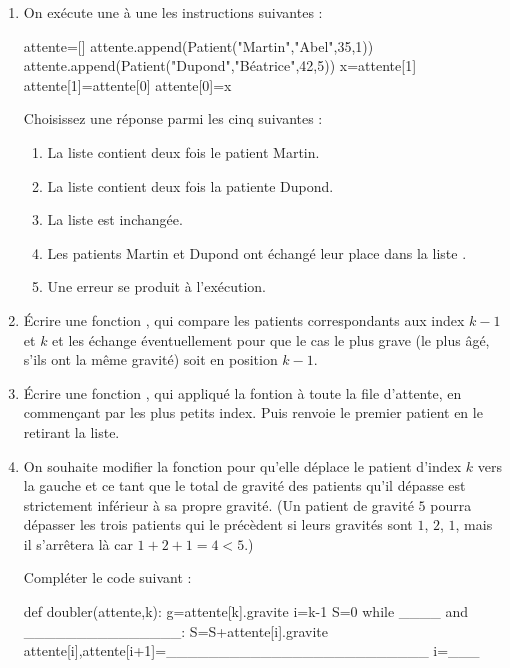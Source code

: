 \documentclass[11pt,a4paper,french,twoside]{VcCours}
\begin{document}
\begin{enumerate}
\begin{enumerate}
    \end{enumerate}
    \item On exécute une à une les instructions suivantes :
\begin{Python}
attente=[]
attente.append(Patient("Martin","Abel",35,1))
attente.append(Patient("Dupond","Béatrice",42,5))
x=attente[1]
attente[1]=attente[0]
attente[0]=x
\end{Python}
    Choisissez une réponse parmi les cinq suivantes :
    \begin{enumerate}
        \item La liste  contient deux fois le patient Martin. 
        \item La liste  contient deux fois la patiente Dupond. 
        \item La liste  est inchangée. 
        \item Les patients Martin et Dupond ont échangé leur place dans la liste . 
        \item Une erreur se produit à l'exécution. 
    \end{enumerate}
    \item Écrire une fonction , qui compare les patients
    correspondants aux index $k-1$ et $k$ et les échange éventuellement pour que
    le cas le plus grave (le plus âgé, s'ils ont la même gravité) soit en position $k-1$.
    \item Écrire une fonction , qui appliqué la fontion 
     à toute la file d'attente, en commençant par les plus petits 
    index. Puis renvoie le premier patient en le retirant la liste.
    \item On souhaite modifier la fonction  pour qu'elle
    déplace le patient d'index $k$ vers la gauche et ce tant que le total de 
    gravité des patients qu'il dépasse est strictement inférieur 
    à sa propre gravité. (Un patient de gravité $5$ pourra dépasser les trois 
    patients qui le précèdent si leurs gravités sont $1$, $2$, $1$, 
    mais il s'arrêtera là car $1+2+1=4<5$.)
    
    Compléter le code suivant :
\begin{Python}
def doubler(attente,k):
    g=attente[k].gravite
    i=k-1
    S=0
    while ____ and _______________:
        S=S+attente[i].gravite
        attente[i],attente[i+1]=_________________________
        i=___
\end{Python}
\end{enumerate}
\end{document}
